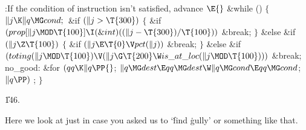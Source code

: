 \B{}:If the condition of instruction  isn't
satisfied, advance \X${}\E{}$\6
\&{while} ()\5
${}\{{}$\1\6
${}\|j\K\|q\MG\\{cond};{}$\6
\&{if} ${}(\|j>\T{300}){}$\5
${}\{{}$\1\6
\&{if} ${}(\\{prop}[\|j\MOD\T{100}]\I(\&{int})((\|j-\T{300})/\T{100})){}$\1\5
\&{break};\2\6
\4${}\}{}$\5
\2\&{else} \&{if} ${}(\|j\Z\T{100}){}$\5
${}\{{}$\1\6
\&{if} ${}(\|j\E\T{0}\V\\{pct}(\|j)){}$\1\5
\&{break};\2\6
\4${}\}{}$\5
\2\&{else} \&{if} ${}(\\{toting}(\|j\MOD\T{100})\V(\|j\G\T{200}\W\\{is\_at%
\_loc}(\|j\MOD\T{100}))){}$\1\5
\&{break};\2\6
\4\\{no\_good}:\6
\&{for} ${}(\\{qq}\K\|q\PP{}$;\6
${}\|q\MG\\{dest}\E\\{qq}\MG\\{dest}\W\|q\MG\\{cond}\E\\{qq}\MG\\{cond}{}$;\6
${}\|q\PP){}$\1\5
;\2\6
\4${}\}{}$\2\par
\U146.\fi

Here we look at  just in case you asked us
to `\.{find} \.{gully}'
or something like that.

